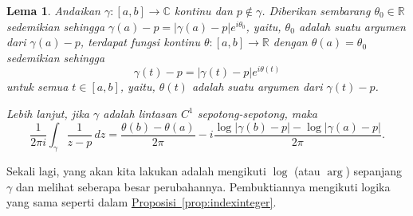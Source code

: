 \documentclass[12pt,openany]{book}
\newcommand{\sabs}[1]{\lvert {#1} \rvert}
\newcommand{\C}{{\mathbb{C}}}
\newcommand{\R}{{\mathbb{R}}}
\theoremstyle{plain}
\newtheorem{lemma}[thm]{Lema}
\theoremstyle{remark}
\theoremstyle{definition}
\theoremstyle{exercise}
\theoremstyle{example}
\newcommand{\propref}[1]{\hyperref[#1]{Proposisi~\ref*{#1}}}
\begin{document}
\begin{lemma} \label{lemma:existenceoftheta}
Andaikan $\gamma \colon [a,b] \to \C$ kontinu dan $p \notin
\gamma$. Diberikan sembarang $\theta_0 \in \R$ sedemikian sehingga
$\gamma(a)-p = \sabs{\gamma(a)-p} e^{i\theta_0}$, yaitu,
$\theta_0$ adalah suatu argumen dari $\gamma(a)-p$,
terdapat fungsi kontinu
$\theta \colon [a,b] \to \R$ dengan $\theta(a) = \theta_0$ sedemikian sehingga
\begin{equation*}
\gamma(t)-p = \sabs{\gamma(t)-p} e^{i\theta(t)}
\end{equation*}
untuk semua $t \in [a,b]$, yaitu, $\theta(t)$ adalah suatu argumen dari $\gamma(t)-p$.

Lebih lanjut, jika $\gamma$ adalah lintasan $C^1$ sepotong-sepotong, maka
\begin{equation*}
\frac{1}{2\pi i} \int_\gamma \frac{1}{z-p} \, dz =
\frac{\theta(b)-\theta(a)}{2\pi} 
- i \frac{\log \sabs{\gamma(b)-p} - \log \sabs{\gamma(a)-p}}{2\pi} .
\end{equation*}
\end{lemma}

Sekali lagi, yang akan kita lakukan adalah mengikuti $\log$ (atau $\arg$) sepanjang $\gamma$ dan melihat
seberapa besar perubahannya. Pembuktiannya mengikuti logika yang sama seperti dalam
\propref{prop:indexinteger}.
\end{document}
